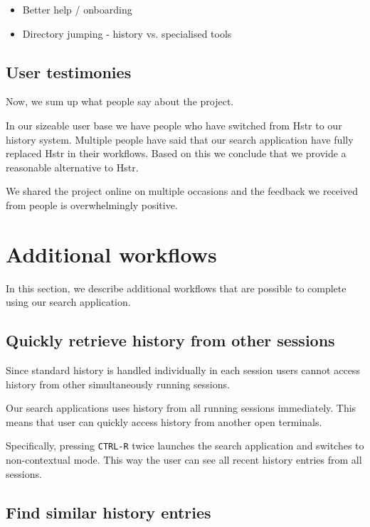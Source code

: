 \begin{itemize}
    \item Better help / onboarding
    \item Directory jumping - history vs. specialised tools
\end{itemize}

\subsection{User testimonies}

Now, we sum up what people say about the project. 

In our sizeable user base we have people who have switched from Hstr to our history system. Multiple people have said that our search application have fully replaced Hstr in their workflows. Based on this we conclude that we provide a reasonable alternative to Hstr.

We shared the project online on multiple occasions and the feedback we received from people is overwhelmingly positive.\cite{resh-feedback}

\section{Additional workflows}

In this section, we describe additional workflows that are possible to complete using our search application. 

\subsection{Quickly retrieve history from other sessions}

Since standard history is handled individually in each session users cannot access history from other simultaneously running sessions. 

Our search applications uses history from all running sessions immediately. This means that user can quickly access history from another open terminals. 

Specifically, pressing \verb|CTRL-R| twice launches the search application and switches to non-contextual mode. This way the user can see all recent history entries from all sessions.

\subsection{Find similar history entries}

